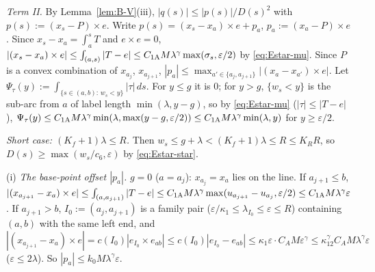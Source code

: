 \emph{Term \textup{II}.} By Lemma~\ref{lem:B-V}(iii), $|q(s)|\le|p(s)|/D(s)^2$ with $p(s):=(x_s-P)\times e$. Write
$p(s)=(x_s-x_a)\times e+p_a$, $p_a:=(x_a-P)\times e$. Since $x_s-x_a=\int_a^sT$ and $e\times e=0$,
$|(x_s-x_a)\times e|\le\int_{(a,s)}|T-e|\le C_{1\mathrm A} M\lambda^\gamma\max(\sigma_s,\varepsilon/2)$ by \eqref{eq:Estar-mu}. Since $P$ is a
convex combination of $x_{a_j}$, $x_{a_{j+1}}$, $|p_a|\le\max_{a'\in\{a_j,a_{j+1}\}}|(x_a-x_{a'})\times e|$. Let
$\Psi_\tau(y):=\int_{\{s\in(a,b):\,w_s<y\}}|\tau|\,ds$. For $y\le g$ it is $0$; for $y>g$, $\{w_s<y\}$ is the sub-arc from $a$ of
label length $\min(\lambda,y-g)$, so by \eqref{eq:Estar-mu} ($|\tau|\le|T-e|$),
$\Psi_\tau(y)\le C_{1\mathrm A} M\lambda^\gamma\min(\lambda,\max(y-g,\varepsilon/2))\le C_{1\mathrm A} M\lambda^\gamma\min(\lambda,y)$ for
$y\ge\varepsilon/2$.

\emph{Short case: $(K_f+1)\lambda\le R$.} Then $w_s\le g+\lambda<(K_f+1)\lambda\le R\le K_RR$, so $D(s)\ge\max(w_s/c_6,\varepsilon)$
by \eqref{eq:Estar-star}.

(i) \emph{The base-point offset $|p_a|$.} \emph{$g=0$} ($a=a_j$): $x_{a_j}=x_a$ lies on the line. If $a_{j+1}\le b$,
$|(x_{a_{j+1}}-x_a)\times e|\le\int_{(a,a_{j+1})}|T-e|\le C_{1\mathrm A} M\lambda^\gamma\max(u_{a_{j+1}}-u_{a_j},\varepsilon/2)
\le C_{1\mathrm A} M\lambda^\gamma\varepsilon$. If $a_{j+1}>b$, $I_0:=(a_j,a_{j+1})$ is a family pair
($\varepsilon/\kappa_1\le\lambda_{I_0}\le\varepsilon\le R$) containing $(a,b)$ with the same left end, and
$|(x_{a_{j+1}}-x_a)\times e|=c(I_0)|e_{I_0}\times e_{ab}|\le c(I_0)|e_{I_0}-e_{ab}|\le\kappa_1\varepsilon\cdot C_AM\varepsilon^\gamma
\le\kappa_12^\gamma C_AM\lambda^\gamma\varepsilon$ ($\varepsilon\le2\lambda$). So $|p_a|\le k_0M\lambda^\gamma\varepsilon$.


